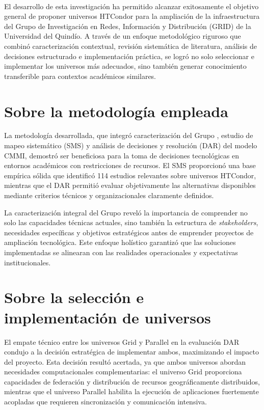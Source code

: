 \label{cap:conclusiones}
\mbox{}\\

El desarrollo de esta investigación ha permitido alcanzar exitosamente el objetivo general de proponer universos HTCondor para la ampliación de la infraestructura del Grupo de Investigación en Redes, Información y Distribución (GRID) de la Universidad del Quindío. A través de un enfoque metodológico riguroso que combinó caracterización contextual, revisión sistemática de literatura, análisis de decisiones estructurado e implementación práctica, se logró no solo seleccionar e implementar los universos más adecuados, sino también generar conocimiento transferible para contextos académicos similares.

\section{Sobre la metodología empleada}
\noindent

La metodología desarrollada, que integró caracterización del Grupo \GRID, estudio de mapeo sistemático (SMS) y análisis de decisiones y resolución (DAR) del modelo CMMI, demostró ser beneficiosa para la toma de decisiones tecnológicas en entornos académicos con restricciones de recursos. El SMS proporcionó una base empírica sólida que identificó 114 estudios relevantes sobre universos HTCondor, mientras que el DAR permitió evaluar objetivamente las alternativas disponibles mediante criterios técnicos y organizacionales claramente definidos.

La caracterización integral del Grupo \GRID reveló la importancia de comprender no solo las capacidades técnicas actuales, sino también la estructura de \textit{stakeholders}, necesidades específicas y objetivos estratégicos antes de emprender proyectos de ampliación tecnológica. Este enfoque holístico garantizó que las soluciones implementadas se alinearan con las realidades operacionales y expectativas institucionales.

\section{Sobre la selección e implementación de universos}
\noindent

El empate técnico entre los universos Grid y Parallel en la evaluación DAR condujo a la decisión estratégica de implementar ambos, maximizando el impacto del proyecto. Esta decisión resultó acertada, ya que ambos universos abordan necesidades computacionales complementarias: el universo Grid proporciona capacidades de federación y distribución de recursos geográficamente distribuidos, mientras que el universo Parallel habilita la ejecución de aplicaciones fuertemente acopladas que requieren sincronización y comunicación intensiva.

